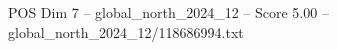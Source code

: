 \begin{textsample}{POS Dim 7 – global\_north\_2024\_12 – Score 5.00 – global\_north\_2024\_12/118686994.txt}
\end{textsample}
